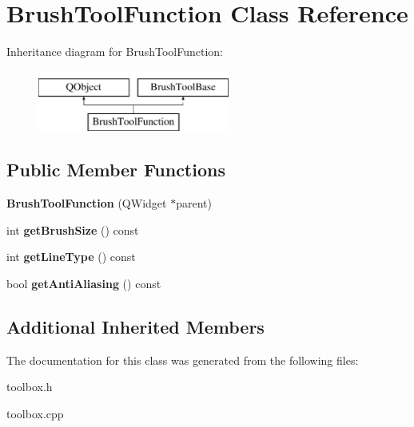 \hypertarget{class_brush_tool_function}{\section{Brush\-Tool\-Function Class Reference}
\label{class_brush_tool_function}
}
Inheritance diagram for Brush\-Tool\-Function\-:\begin{figure}[H]
\begin{center}
\leavevmode
\includegraphics[height=2.000000cm]{class_brush_tool_function}
\end{center}
\end{figure}
\subsection*{Public Member Functions}
\begin{DoxyCompactItemize}
\item 
\hypertarget{class_brush_tool_function_aa1cb6986ab30ae64128002c692d4290f}{{\bfseries Brush\-Tool\-Function} (Q\-Widget $\ast$parent)}\label{class_brush_tool_function_aa1cb6986ab30ae64128002c692d4290f}

\item 
\hypertarget{class_brush_tool_function_a827a6a848f2246a63f58f876b950d0cf}{int {\bfseries get\-Brush\-Size} () const }\label{class_brush_tool_function_a827a6a848f2246a63f58f876b950d0cf}

\item 
\hypertarget{class_brush_tool_function_a49319b286a0b4a9f7e093963ac123b26}{int {\bfseries get\-Line\-Type} () const }\label{class_brush_tool_function_a49319b286a0b4a9f7e093963ac123b26}

\item 
\hypertarget{class_brush_tool_function_a0665bc3c2c304b5889629680912484a5}{bool {\bfseries get\-Anti\-Aliasing} () const }\label{class_brush_tool_function_a0665bc3c2c304b5889629680912484a5}

\end{DoxyCompactItemize}
\subsection*{Additional Inherited Members}


The documentation for this class was generated from the following files\-:\begin{DoxyCompactItemize}
\item 
toolbox.\-h\item 
toolbox.\-cpp\end{DoxyCompactItemize}
